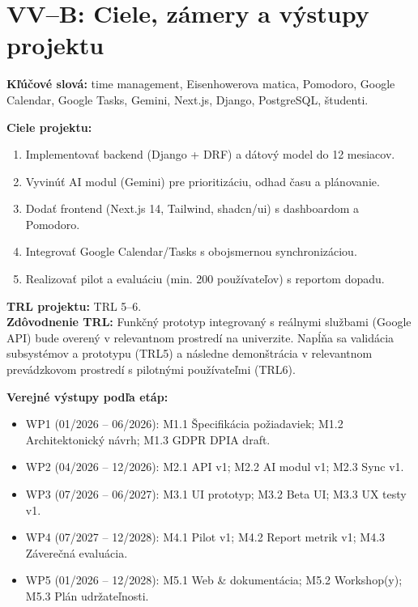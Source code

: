 \documentclass[11pt,a4paper]{article}
\begin{document}
\section*{VV–B: Ciele, zámery a výstupy projektu}
\textbf{Kľúčové slová:} time management, Eisenhowerova matica, Pomodoro, Google Calendar, Google Tasks, Gemini, Next.js, Django, PostgreSQL, študenti.

\textbf{Ciele projektu:}
\begin{enumerate}
\item Implementovať backend (Django + DRF) a dátový model do 12 mesiacov.
\item Vyvinúť AI modul (Gemini) pre prioritizáciu, odhad času a plánovanie.
\item Dodať frontend (Next.js 14, Tailwind, shadcn/ui) s dashboardom a Pomodoro.
\item Integrovať Google Calendar/Tasks s obojsmernou synchronizáciou.
\item Realizovať pilot a evaluáciu (min. 200 používateľov) s reportom dopadu.
\end{enumerate}

\noindent\textbf{TRL projektu:} TRL 5–6.\\
\textbf{Zdôvodnenie TRL:} Funkčný prototyp integrovaný s reálnymi službami (Google API) bude overený v relevantnom prostredí na univerzite. Napĺňa sa validácia subsystémov a prototypu (TRL5) a následne demonštrácia v relevantnom prevádzkovom prostredí s pilotnými používateľmi (TRL6).

\noindent\textbf{Verejné výstupy podľa etáp:}
\begin{itemize}
\item WP1 (01/2026 – 06/2026): M1.1 Špecifikácia požiadaviek; M1.2 Architektonický návrh; M1.3 GDPR DPIA draft.
\item WP2 (04/2026 – 12/2026): M2.1 API v1; M2.2 AI modul v1; M2.3 Sync v1.
\item WP3 (07/2026 – 06/2027): M3.1 UI prototyp; M3.2 Beta UI; M3.3 UX testy v1.
\item WP4 (07/2027 – 12/2028): M4.1 Pilot v1; M4.2 Report metrik v1; M4.3 Záverečná evaluácia.
\item WP5 (01/2026 – 12/2028): M5.1 Web \& dokumentácia; M5.2 Workshop(y); M5.3 Plán udržateľnosti.
\end{itemize}

\end{document}
